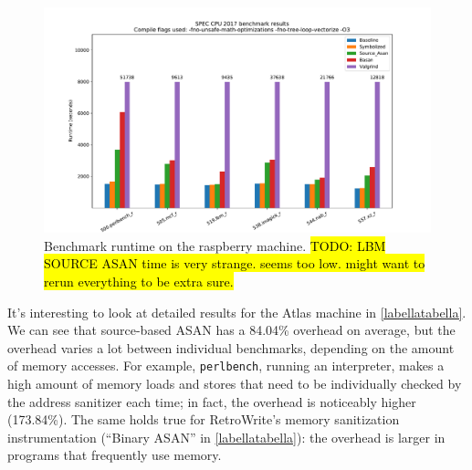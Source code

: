 \documentclass[a4paper,11pt,oneside]{report}
\newcommand{\sysname}{RetroWrite\xspace}
\DeclareRobustCommand{\todo}[1]{{\sethlcolor{cyan}\hl{TODO: #1}}}
\begin{document}
\begin{center}
\begin{figure}[h]
\includegraphics[width=\textwidth]{raspberry.pdf}
\centering
	\caption{Benchmark runtime on the raspberry machine. \todo{LBM SOURCE ASAN time is very strange. seems too low. might want to rerun everything to be extra sure. }}
\label{plot2}
\end{figure}
\end{center}


It's interesting to look at detailed results for the Atlas machine in 
\autoref{labellatabella}. We can see that source-based ASAN has a 84.04\%
overhead on average, but the overhead varies a lot between individual
benchmarks, depending on the amount of memory accesses. For example,
\texttt{perlbench}, running an interpreter, makes a high amount of memory loads
and stores that need to be individually checked by the address sanitizer each
time; in fact, the overhead is noticeably higher (173.84\%). The same holds
true for \sysname's memory sanitization instrumentation (``Binary ASAN'' in
\autoref{labellatabella}): the overhead is larger in programs that frequently
use memory. 
\end{document}
